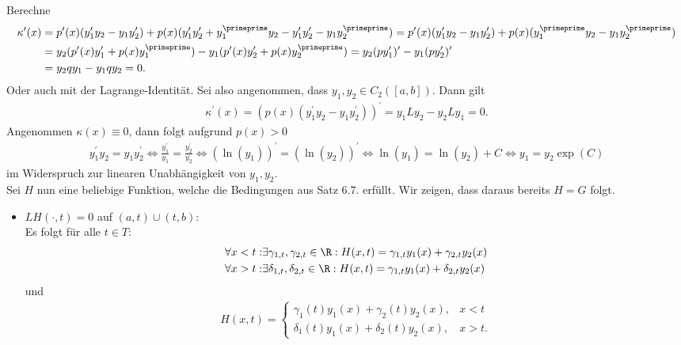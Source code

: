 \begin{solution}
Berechne
\begin{align*}
  \kappa^{\prime}(x) &= p^{\prime}(x)(y_1^{\prime}y_2 - y_1y_2^{\prime})
  + p(x)(y_1^{\prime}y_2^{\prime} + y_1^{\primeprime}y_2 - y_1^{\prime}y_2^{\prime} - y_1y_2^{\primeprime})
  = p^{\prime}(x)(y_1^{\prime}y_2 - y_1y_2^{\prime})
  + p(x)(y_1^{\primeprime}y_2  - y_1y_2^{\primeprime}) \\
  &= y_2(p^{\prime}(x)y_1^{\prime} + p(x)y_1^{\primeprime}) -
  y_1(p^{\prime}(x)y_2^{\prime} + p(x)y_2^{\primeprime})
  = y_2(py_1^{\prime})^{\prime} - y_1(py_2^{\prime})^{\prime} \\
  &= y_2qy_1 - y_1qy_2 = 0.
\end{align*}
Oder auch mit der Lagrange-Identität. Sei also angenommen, dass $y_1,y_2 \in C_2([a,b])$. Dann gilt
\begin{align*}
  \kappa^{\prime}(x) = (p(x)(y_1^{\prime}y_2 - y_1y_2^{\prime}))^{\prime} = y_1Ly_2 - y_2Ly_1 = 0.
\end{align*}
Angenommen $\kappa(x) \equiv 0$, dann folgt aufgrund $p(x) > 0$
\begin{align*}
  y_1^{\prime}y_2 = y_1y_2^{\prime} \iff
  \frac{y_1^{\prime}}{y_1} = \frac{y_2^{\prime}}{y_2} \iff
  (\ln(y_1))^{\prime} = (\ln(y_2))^{\prime} \iff
  \ln(y_1) = \ln(y_2) + C \iff
  y_1 = y_2\exp(C)
\end{align*}
im Widerspruch zur linearen Unabhängigkeit von $y_1,y_2$. \\
Sei $H$ nun eine beliebige Funktion, welche die Bedingungen aus Satz 6.7.
erfüllt. Wir zeigen, dass daraus bereits $H = G$ folgt.
\begin{itemize}
  \item $LH(\cdot,t) = 0$ auf $(a,t) \cup (t,b)$: \\
  Es folgt für alle $t \in T:$
  \begin{align*}
    \forall x < t:& \exists \gamma_{1,t}, \gamma_{2,t} \in \R:
    H(x,t) = \gamma_{1,t}y_1(x) + \gamma_{2,t}y_2(x) \\
    \forall x > t:& \exists \delta_{1,t}, \delta_{2,t} \in \R:
    H(x,t) = \gamma_{1,t}y_1(x) + \delta_{2,t}y_2(x)
  \end{align*}
  und
  \begin{align*}
    H(x,t) = \begin{cases}
      \gamma_1(t)y_1(x) + \gamma_2(t)y_2(x), & x < t \\
      \delta_1(t)y_1(x) + \delta_2(t)y_2(x), & x > t.
    \end{cases}

\end{align*}
\end{itemize}
\end{solution}
